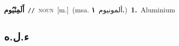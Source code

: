 \documentclass[10pt,a4paper,twoside]{article} %
\begin{document}
\begin{multicols}{2}
{\setlength\topsep{0pt}\textbf{\foreignlanguage{arabic}{أَلَمِنْيُوم}}\ {\color{gray}\texttt{//}\color{black}}\ \textsc{noun}\ [m.]\ \color{gray}(msa. \foreignlanguage{arabic}{ألمونيوم}~\foreignlanguage{arabic}{\textbf{١.}})\color{black}\ \textbf{1.}~Aluminium\ } \vspace{2mm}

\vspace{-3mm}
\subsection*{\color{blue}\foreignlanguage{arabic}{ء.ل.ه}\color{blue}{}} 


\end{multicols}
\end{document}
